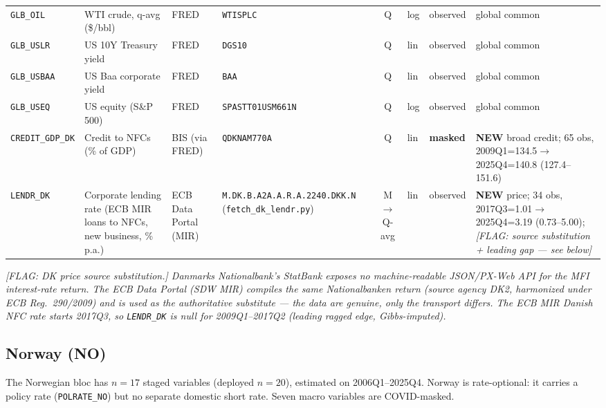 {\begin{longtable}{@{}lp{2.9cm}p{1.9cm}p{2.0cm}cp{1.4cm}p{1.7cm}p{2.6cm}@{}}
\texttt{GLB\_OIL} & WTI crude, q-avg (\$/bbl) & FRED & \texttt{WTISPLC} & Q & log & observed & global common\\
\texttt{GLB\_USLR} & US 10Y Treasury yield & FRED & \texttt{DGS10} & Q & lin & observed & global common\\
\texttt{GLB\_USBAA} & US Baa corporate yield & FRED & \texttt{BAA} & Q & lin & observed & global common\\
\texttt{GLB\_USEQ} & US equity (S\&P 500) & FRED & \texttt{SPASTT01USM661N} & Q & log & observed & global common\\
\texttt{CREDIT\_GDP\_DK} & Credit to NFCs (\% of GDP) & BIS (via FRED) & \texttt{QDKNAM770A} & Q & lin & \textbf{masked} & \textbf{NEW} broad credit; 65 obs, 2009Q1=134.5$\to$2025Q4=140.8 (127.4--151.6)\\
\texttt{LENDR\_DK} & Corporate lending rate (ECB MIR loans to NFCs, new business, \% p.a.) & ECB Data Portal (MIR) & \texttt{M.\allowbreak DK.\allowbreak B.\allowbreak A2A.\allowbreak A.\allowbreak R.\allowbreak A.2240.\allowbreak DKK.\allowbreak N} (\texttt{fetch\_dk\_lendr.py}) & M$\to$Q-avg & lin & observed & \textbf{NEW} price; 34 obs, 2017Q3=1.01$\to$2025Q4=3.19 (0.73--5.00); \textit{[FLAG: source substitution + leading gap --- see below]}\\
\end{longtable}}

\noindent\textit{[FLAG: DK price source substitution.] Danmarks Nationalbank's
StatBank exposes no machine-readable JSON/PX-Web API for the MFI interest-rate
return. The ECB Data Portal (SDW MIR) compiles the \emph{same} Nationalbanken
return (source agency DK2, harmonized under ECB Reg.~290/2009) and is used as
the authoritative substitute --- the data are genuine, only the transport
differs. The ECB MIR Danish NFC rate starts 2017Q3, so \texttt{LENDR\_DK} is
null for 2009Q1--2017Q2 (leading ragged edge, Gibbs-imputed).}

\subsection{Norway (NO)}\label{sec:data:NO}

The Norwegian bloc has $n=17$ staged variables (deployed $n=20$), estimated on
2006Q1--2025Q4. Norway is rate-optional: it carries a policy rate
(\texttt{POLRATE\_NO}) but no separate domestic short rate. Seven macro
variables are COVID-masked.

